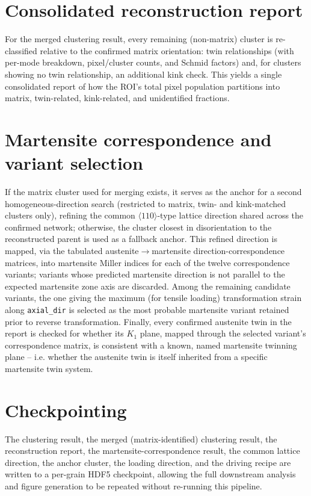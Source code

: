 \documentclass[11pt]{article}
\begin{document}
\section{Consolidated reconstruction report}

For the merged clustering result, every remaining (non-matrix) cluster is
re-classified relative to the confirmed matrix orientation: twin
relationships (with per-mode breakdown, pixel/cluster counts, and Schmid
factors) and, for clusters showing no twin relationship, an additional kink
check. This yields a single consolidated report of how the ROI's total
pixel population partitions into matrix, twin-related, kink-related, and
unidentified fractions.

\section{Martensite correspondence and variant selection}

If the matrix cluster used for merging exists, it serves as the anchor for
a second homogeneous-direction search (restricted to matrix, twin- and
kink-matched clusters only), refining the common $\langle110\rangle$-type
lattice direction shared across the confirmed network; otherwise, the
cluster closest in disorientation to the reconstructed parent is used as a
fallback anchor. This refined direction is mapped, via the tabulated
austenite$\to$martensite direction-correspondence matrices, into
martensite Miller indices for each of the twelve correspondence variants;
variants whose predicted martensite direction is not parallel to the
expected martensite zone axis are discarded. Among the remaining candidate
variants, the one giving the maximum (for tensile loading) transformation
strain along \texttt{axial\_dir} is selected as the most probable
martensite variant retained prior to reverse transformation. Finally, every
confirmed austenite twin in the report is checked for whether its
$K_1$ plane, mapped through the selected variant's correspondence matrix,
is consistent with a known, named martensite twinning plane -- i.e.
whether the austenite twin is itself inherited from a specific martensite
twin system.

\section{Checkpointing}

The clustering result, the merged (matrix-identified) clustering result,
the reconstruction report, the martensite-correspondence result, the
common lattice direction, the anchor cluster, the loading direction, and
the driving recipe are written to a per-grain HDF5 checkpoint, allowing the
full downstream analysis and figure generation to be repeated without
re-running this pipeline.
\end{document}
